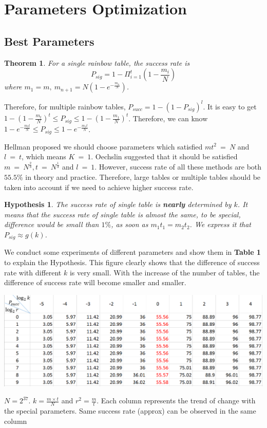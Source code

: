 \documentclass[runningheads,a4paper]{llncs}
\newtheorem{thm}{Theorem}
\newtheorem{hyp}{Hypothesis}
\begin{document}
\section{Parameters Optimization}
\subsection{Best Parameters}
\begin{thm}{\cite{oechslin2003making}}
For a single rainbow table, the success rate is $$P_{sig}=1-\displaystyle\Pi_{i=1}^{t}(1-\frac{m_i}{N})$$ where $m_1 = m,~ m_{n+1} = N(1-e^{-\frac{m_n}{N}})$.  
\end{thm}

Therefore, for multiple rainbow tables, $P_{succ} = 1 - (1-P_{sig})^l$. It is easy to get $1-(1-\frac{m_t}{N})^t \leq P_{sig} \leq 1- (1-\frac{m_1}{N})^t$. Therefore, we can know $1 - e^{-\frac{m_t t}{N}} \leq P_{sig} \leq 1 - e^{-\frac{m_1 t}{N}}$.

Hellman \cite{hellman1980cryptanalytic} proposed we should choose parameters which satisfied $mt^2~=~N$ and $l~=~t$, which means $K~=~1$. Oechslin \cite{avoine2008characterization} suggested that it should be satisfied $m~=~N^{\frac{2}{3}}, t~=~N^{\frac{1}{3}}$ and $l~=~1$. However, success rate of all these methods are both $55.5\%$ in theory and practice. Therefore, large tables or multiple tables should be taken into account if we need to achieve higher success rate.

\begin{hyp} The success rate of single table is \textbf{nearly} determined by $k$. It means that the success rate of single table is almost the same, to be special, difference would be small than $1\%$, as soon as $m_1 t_1 = m_2 t_2$. We express it that $P_{sig} \approx g(k)$.\end{hyp}

We conduct some experiments of different parameters and show them in \textbf{Table 1} to explain the Hypothesis. This figure clearly shows that the difference of success rate with different $k$ is very small. With the increase of the number of tables, the difference of success rate will become smaller and smaller.

\begin{table}
  \includegraphics[width=\linewidth]{table1}
  \caption{$N = 2^{37}$. $k = \frac{m \times t}{N}$ and $r^2 = \frac{m}{t}$.  Each column represents the trend of change with the special parameters. Same success rate (approx) can be observed in the same column}
\end{table}
\end{document}
